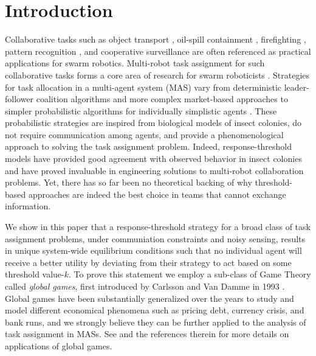 \documentclass[conference]{ieeeconf}
\begin{document}
\section{Introduction}\label{sec:intro}
Collaborative tasks such as object transport \cite{Sugawara2012}, oil-spill containment \cite{Beni2005}, firefighting \cite{Krishnanand2006}, pattern recognition \cite{Beni1993}, and cooperative surveillance are often referenced as practical applications for swarm robotics. Multi-robot task assignment for such collaborative tasks forms a core area of research for swarm roboticists \cite{Gerkey2004}. Strategies for task allocation in a multi-agent system (MAS) vary from deterministic leader-follower coalition algorithms \cite{Chen2011} and more complex market-based approaches \cite{Amstutz2008,Vig2007} to simpler probabilistic algorithms for individually simplistic agents \cite{Dantu2012}. These probabilistic strategies are inspired from biological models of insect colonies, do not require communication among agents, and provide a phenomenological approach to solving the task assignment problem. Indeed, response-threshold models have provided good agreement with observed behavior in insect colonies and have proved invaluable in engineering solutions to multi-robot collaboration problems. Yet, there has so far been no theoretical backing of why threshold-based approaches are indeed the best choice in teams that cannot exchange information.

We show in this paper that a response-threshold strategy for a broad class of task assignment problems, under communiation constraints  and noisy sensing, results in unique system-wide equilibrium conditions such that no individual agent will receive a better utility by deviating from their strategy to act based on some threshold value-$k$. To prove this statement we employ a sub-class of Game Theory called \emph{global games}, first introduced by Carlsson and Van Damme in 1993 \cite{Carlsson1993}. Global games have been substantially generalized over the years to study and model different economical phenomena such as pricing debt, currency crisis, and bank runs, and we strongly believe they can be further applied to the analysis of task assignment in MASs. See \cite{Morris2000} and the references therein for more details on applications of global games.
\end{document}
